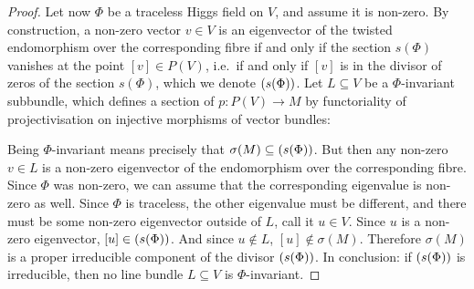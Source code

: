 \documentclass[A4paper, 12pt, british, reqno]{amsart}
\let\div\relax
\DeclareMathOperator{\div}{div}
\begin{document}
\begin{prop}
\begin{proof}
	Let now $\Phi$ be a traceless Higgs field on $V$, and assume it is non-zero.
	By construction, a non-zero vector $v\in V$ is an eigenvector of the twisted endomorphism over the corresponding fibre if and only if the section $s(\Phi)$ vanishes at the point $[v]\in P(V)$, i.e.~if and only if $[v]$ is in the divisor of zeros of the section $s(\Phi)$, which we denote $\div(s(\Phi))$.
	Let $L\subseteq V$ be a $\Phi$-invariant subbundle, which defines a section of $p\colon P(V)\to M$ by functoriality of projectivisation on injective morphisms of vector bundles:
	\begin{center}
	\end{center}
	Being $\Phi$-invariant means precisely that $\sigma(M)\subseteq \div(s(\Phi))$.
	But then any non-zero $v\in L$ is a non-zero eigenvector of the endomorphism over the corresponding fibre.
	Since $\Phi$ was non-zero, we can assume that the corresponding eigenvalue is non-zero as well.
	Since $\Phi$ is traceless, the other eigenvalue must be different, and there must be some non-zero eigenvector outside of $L$, call it $u\in V$.
	Since $u$ is a non-zero eigenvector, $[u]\in \div(s(\Phi))$.
	And since $u\not\in L$, $[u]\not\in \sigma(M)$.
	Therefore $\sigma(M)$ is a proper irreducible component of the divisor $\div(s(\Phi))$.
	In conclusion: if $\div(s(\Phi))$ is irreducible, then no line bundle $L\subseteq V$ is $\Phi$-invariant.
    \end{proof}
\end{prop}



\vspace{0.3cm}
\end{document}
